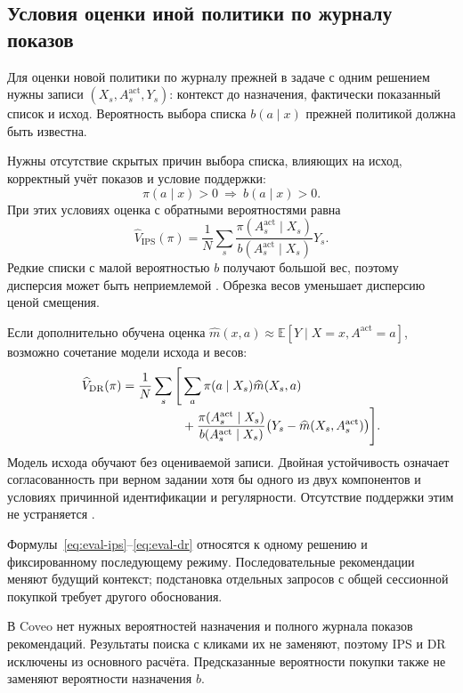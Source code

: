 \documentclass[12pt,a4paper]{article}
\newcommand{\E}{\mathbb E}
\theoremstyle{plainru}
\begin{document}
\subsection{Условия оценки иной политики по журналу показов}
\label{sec:eval-ope}

Для оценки новой политики по журналу прежней в задаче с одним решением
нужны записи $(X_s,A_s^{\mathrm{act}},Y_s)$: контекст до назначения,
фактически показанный список и исход. Вероятность выбора списка
$b(a\mid x)$ прежней политикой должна быть известна.

Нужны отсутствие скрытых причин выбора списка, влияющих на исход,
корректный учёт показов и условие поддержки:
\begin{equation}\label{eq:eval-support}
 \pi(a\mid x)>0\ \Longrightarrow\ b(a\mid x)>0.
\end{equation}
При этих условиях оценка с обратными вероятностями равна
\begin{equation}\label{eq:eval-ips}
 \widehat V_{\mathrm{IPS}}(\pi)
 =\frac1N\sum_s
  \frac{\pi(A_s^{\mathrm{act}}\mid X_s)}
       {b(A_s^{\mathrm{act}}\mid X_s)}Y_s.
\end{equation}
Редкие списки с малой вероятностью $b$ получают большой вес,
поэтому дисперсия может быть неприемлемой \cite{ips}.
Обрезка весов уменьшает дисперсию ценой смещения.

Если дополнительно обучена оценка
$\widehat m(x,a)\approx\E[Y\mid X=x,A^{\mathrm{act}}=a]$,
возможно сочетание модели исхода и весов:
\begin{align}
 \widehat V_{\mathrm{DR}}(\pi)
 =\frac1N\sum_s\Bigg[&\sum_a\pi(a\mid X_s)\widehat m(X_s,a)
 \notag\\[-0.2em]
 &+\frac{\pi(A_s^{\mathrm{act}}\mid X_s)}
       {b(A_s^{\mathrm{act}}\mid X_s)}
       \bigl(Y_s-\widehat m(X_s,A_s^{\mathrm{act}})\bigr)\Bigg].
 \label{eq:eval-dr}
\end{align}
Модель исхода обучают без оцениваемой записи. Двойная устойчивость
означает согласованность при верном задании хотя бы одного из двух
компонентов и условиях причинной идентификации и регулярности.
Отсутствие поддержки этим не устраняется \cite{dr}.

Формулы~\eqref{eq:eval-ips}--\eqref{eq:eval-dr} относятся к одному решению
и фиксированному последующему режиму. Последовательные рекомендации
меняют будущий контекст; подстановка отдельных запросов с общей
сессионной покупкой требует другого обоснования.

В Coveo нет нужных вероятностей назначения и полного журнала показов
рекомендаций. Результаты поиска с кликами их не заменяют, поэтому IPS
и DR исключены из основного расчёта. Предсказанные вероятности покупки
также не заменяют вероятности назначения $b$.
\end{document}
